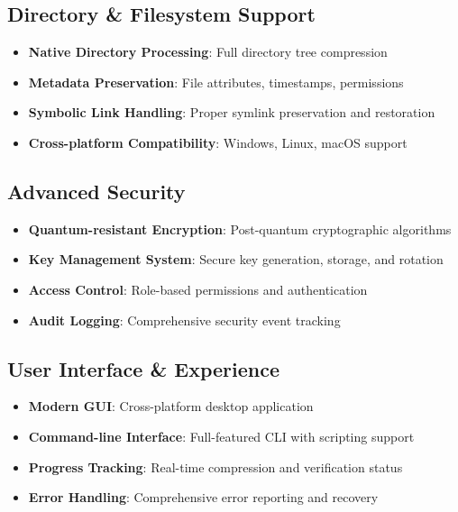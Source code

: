 \documentclass[12pt,a4paper]{article}
\begin{document}
\subsection{Directory \& Filesystem Support}
\begin{itemize}
    \item \textbf{Native Directory Processing}: Full directory tree compression
    \item \textbf{Metadata Preservation}: File attributes, timestamps, permissions
    \item \textbf{Symbolic Link Handling}: Proper symlink preservation and restoration
    \item \textbf{Cross-platform Compatibility}: Windows, Linux, macOS support
\end{itemize}

\subsection{Advanced Security}
\begin{itemize}
    \item \textbf{Quantum-resistant Encryption}: Post-quantum cryptographic algorithms
    \item \textbf{Key Management System}: Secure key generation, storage, and rotation
    \item \textbf{Access Control}: Role-based permissions and authentication
    \item \textbf{Audit Logging}: Comprehensive security event tracking
\end{itemize}

\subsection{User Interface \& Experience}
\begin{itemize}
    \item \textbf{Modern GUI}: Cross-platform desktop application
    \item \textbf{Command-line Interface}: Full-featured CLI with scripting support
    \item \textbf{Progress Tracking}: Real-time compression and verification status
    \item \textbf{Error Handling}: Comprehensive error reporting and recovery
\end{itemize}

\end{document}
